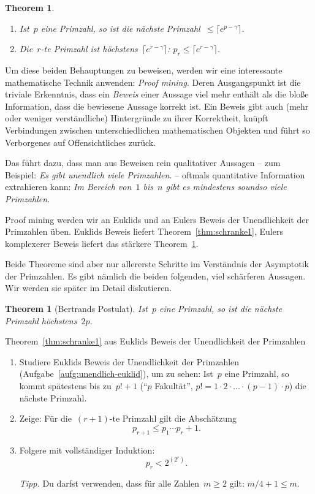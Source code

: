 \documentclass[twoside]{../zirkelblatt1415}
\theoremstyle{definition}
\theoremstyle{plain}
\newtheorem{thm}[defn]{Theorem}
\theoremstyle{remark}
\begin{document}
\begin{thm}\label{thm:schranke2}\ \\[-2em]
\begin{enumerate}
\item
Ist~$p$ eine Primzahl, so ist die nächste Primzahl~$\leq \lceil e^{p-\gamma}
\rceil$. \\[-2em]
\item
Die~$r$-te Primzahl ist höchstens~$\lceil e^{r-\gamma} \rceil$: $p_r
\leq \lceil e^{r-\gamma} \rceil$.
\end{enumerate}
\end{thm}

Um diese beiden Behauptungen zu beweisen, werden wir eine interessante
mathematische Technik anwenden: \emph{Proof mining}. Deren Ausgangspunkt ist
die triviale Erkenntnis, dass ein \emph{Beweis} einer Aussage viel mehr enthält
als die bloße Information, dass die bewiesene Aussage korrekt ist. Ein Beweis
gibt auch (mehr oder weniger verständliche) Hintergründe zu ihrer Korrektheit,
knüpft Verbindungen zwischen unterschiedlichen mathematischen Objekten und
führt so Verborgenes auf Offensichtliches zurück.

Das führt dazu, dass man aus Beweisen rein qualitativer Aussagen -- zum
Beispiel: \emph{Es gibt unendlich viele Primzahlen.} -- oftmals quantitative
Information extrahieren kann: \emph{Im Bereich von~$1$ bis~$n$ gibt es
mindestens soundso viele Primzahlen.}

Proof mining werden wir an Euklids und an Eulers Beweis der Unendlichkeit der
Primzahlen üben. Euklids Beweis liefert Theorem~\ref{thm:schranke1}, Eulers
komplexerer Beweis liefert das stärkere Theorem~\ref{thm:schranke2}.

Beide Theoreme sind aber nur allererste Schritte im Verständnis der Asymptotik
der Primzahlen. Es gibt nämlich die beiden folgenden, viel schärferen Aussagen.
Wir werden sie später im Detail diskutieren.

\begin{thm}[Bertrands Postulat]Ist~$p$ eine Primzahl, so ist die nächste
Primzahl höchstens~$2p$.
\end{thm}

\begin{aufgabe}{Theorem~\ref{thm:schranke1} aus Euklids Beweis der
Unendlichkeit der Primzahlen}
\begin{enumerate}
\item Studiere Euklids Beweis der Unendlichkeit der Primzahlen
(Aufgabe~\ref{aufg:unendlich-euklid}), um zu sehen: Ist~$p$ eine Primzahl, so
kommt spätestens bis zu~$p! + 1$ ("`$p$ Fakultät"', $p! = 1 \cdot 2 \cdot
\ldots \cdot (p-1) \cdot p$) die nächste Primzahl.
\item Zeige: Für die~$(r+1)$-te Primzahl gilt die Abschätzung
\[ p_{r+1} \leq p_1 \cdots p_r + 1. \]
\item Folgere mit vollständiger Induktion:
\[ p_r < 2^{(2^r)}. \]

\emph{Tipp.} Du darfst verwenden, dass für alle Zahlen~$m \geq 2$ gilt: $m/4 +
1 \leq m$.
\end{enumerate}\fixlistspacing
\end{aufgabe}
\end{document}
